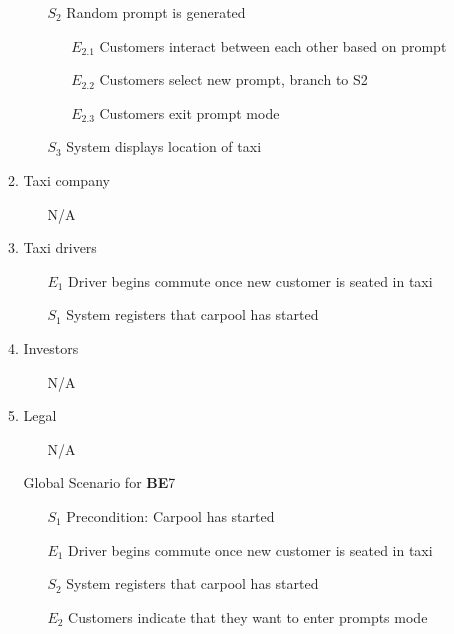 \documentclass[]{article}
\begin{document}
\begin{enumerate}[{\textbf{BE}}1.]
\begin{enumerate}[{\textbf{VP7}}.1]
\begin{enumerate}
                \item[$S_2$] Random prompt is generated
                \begin{enumerate}
                    \item[$E_{2.1}$] Customers interact between each other based on prompt
                    \item[$E_{2.2}$] Customers select new prompt, branch to S2
                    \item[$E_{2.3}$] Customers exit prompt mode
                \end{enumerate}
\item[$S_3$] System displays location of taxi
            \end{enumerate}
        \item Taxi company
            \begin{enumerate}
                \item[N/A]
            \end{enumerate}
        \item Taxi drivers
            \begin{enumerate}
                \item[$E_1$] Driver begins commute once new customer is seated in taxi
                \item[$S_1$] System registers that carpool has started
            \end{enumerate}
        \item Investors
            \begin{enumerate}
                \item[N/A]
            \end{enumerate}
        \item Legal
            \begin{enumerate}
                \item[N/A]
            \end{enumerate}
        \item[Global] Scenario for \textbf{BE}7
            \begin{enumerate}
                \item[$S_1$] Precondition: Carpool has started
                \item[$E_1$] Driver begins commute once new customer is seated in taxi
                \item[$S_2$] System registers that carpool has started
                \item[$E_2$] Customers indicate that they want to enter prompts mode

\end{enumerate}
\end{enumerate}
\end{enumerate}
\end{document}

